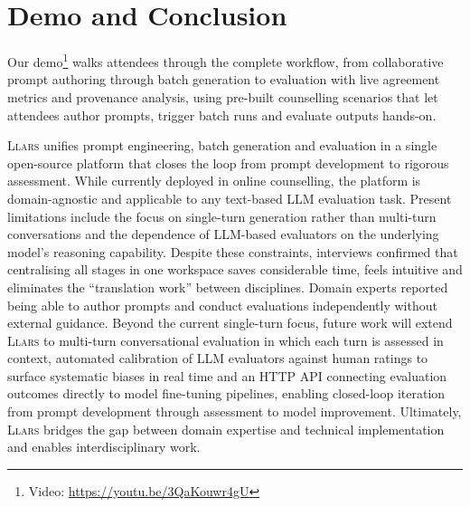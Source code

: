 \documentclass{article}
\begin{document}
\section{Demo and Conclusion}

Our demo\footnote{Video: \url{https://youtu.be/3QaKouwr4gU}} walks attendees through the complete workflow, from collaborative prompt authoring through batch generation to evaluation with live agreement metrics and provenance analysis, using pre-built counselling scenarios that let attendees author prompts, trigger batch runs and evaluate outputs hands-on.

\textsc{Llars} unifies prompt engineering, batch generation and evaluation in a single open-source platform that closes the loop from prompt development to rigorous assessment.
While currently deployed in online counselling, the platform is domain-agnostic and applicable to any text-based LLM evaluation task.
Present limitations include the focus on single-turn generation rather than multi-turn conversations and the dependence of LLM-based evaluators on the underlying model's reasoning capability.
Despite these constraints, interviews confirmed that centralising all stages in one workspace saves considerable time, feels intuitive and eliminates the ``translation work'' between disciplines. Domain experts reported being able to author prompts and conduct evaluations independently without external guidance.
Beyond the current single-turn focus, future work will extend \textsc{Llars} to multi-turn conversational evaluation in which each turn is assessed in context, automated calibration of LLM evaluators against human ratings to surface systematic biases in real time and an HTTP API connecting evaluation outcomes directly to model fine-tuning pipelines, enabling closed-loop iteration from prompt development through assessment to model improvement.
Ultimately, \textsc{Llars} bridges the gap between domain expertise and technical implementation and enables interdisciplinary work.




\end{document}

